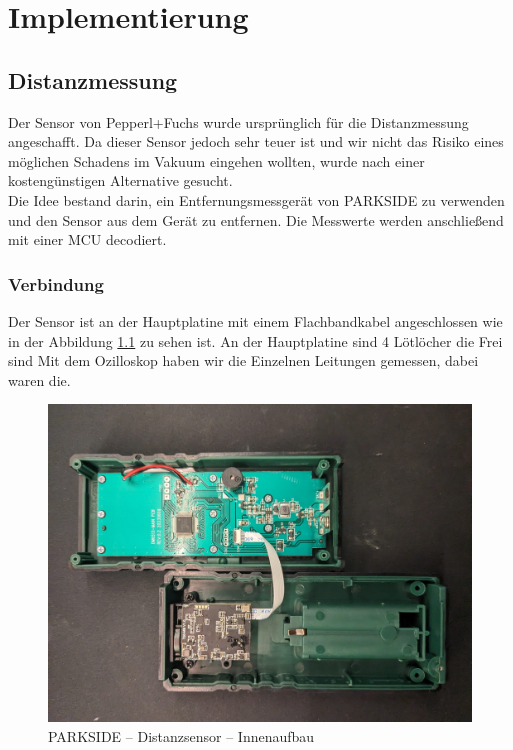 \chapter{Implementierung}

\section{Distanzmessung}

Der Sensor von Pepperl+Fuchs wurde ursprünglich für die Distanzmessung angeschafft. Da dieser Sensor jedoch sehr teuer ist und wir nicht das Risiko eines möglichen Schadens im Vakuum eingehen wollten, wurde nach einer kostengünstigen Alternative gesucht.\\
Die Idee bestand darin, ein Entfernungsmessgerät von PARKSIDE zu verwenden und den Sensor aus dem Gerät zu entfernen. Die Messwerte werden anschließend mit einer MCU decodiert.

\subsection{Verbindung}
Der Sensor ist an der Hauptplatine mit einem Flachbandkabel angeschlossen wie in der Abbildung \ref{img_2_2:sen_dis_parkside:1} zu sehen ist. An der Hauptplatine sind 4 Lötlöcher die Frei sind 
Mit dem Ozilloskop haben wir die Einzelnen Leitungen gemessen, dabei waren die.


\begin{figure}[ht]
	\begin{center}
		\includegraphics[width=1\textwidth]{img/2_sen/dis_parkside_1_outside.png}
		\caption{PARKSIDE – Distanzsensor – Innenaufbau}
		\label{img_2_2:sen_dis_parkside:1}
	\end{center}
\end{figure}


